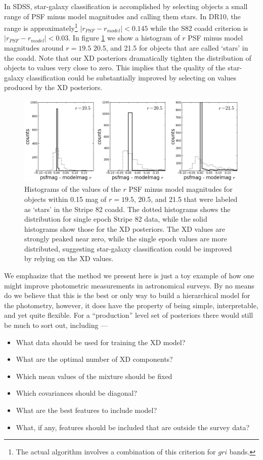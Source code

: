 \documentclass[12pt,preprint]{aastex}
\begin{document}
In SDSS, star-galaxy classification is accomplished by selecting objects a
small range of PSF minus model magnitudes and calling them stars.  In DR10,
the range is approximately\footnote{The actual algorithm involves a combination
of this criterion for $gri$ bands.} $|r_{PSF} - r_{model}| < 0.145$ while the
S82 coadd criterion is $|r_{PSF} - r_{model}| < 0.03$.  In figure \ref{fig:pmm}
we show a histogram of $r$ PSF minus model magnitudes around $r=19.5$
20.5, and 21.5 for objects that are called `stars' in the coadd.  Note that
our XD posteriors dramatically tighten the distribution of objects to values
very close to zero.  This implies that the quality of the star-galaxy
classification could be substantially improved by selecting on values produced
by the XD posteriors.

\begin{figure}
\centering
\includegraphics[width=16cm]{fig6.png}
\caption{Histograms of the values of the $r$ PSF minus model magnitudes for 
objects within 0.15 mag of $r = 19.5$, 20.5, and 21.5 that were labeled as 
`stars' in the Stripe 82 coadd.  The dotted histograms shows the distribution
for single epoch Stripe 82 data, while the solid histograms show those for the
XD posteriors.  The XD values are strongly peaked near zero, while the single
epoch values are more distributed, suggesting star-galaxy classification
could be improved by relying on the XD values.  
}
\label{fig:pmm}
\end{figure}

We emphasize that the method we present here is just a toy example of how one 
might improve photometric measurements in astronomical surveys.  By no means do
we believe that this is the best or only way to build a hierarchical model for 
the photometry, however, it does have the property of being simple,
interpretable, and yet quite flexible.  For a ``production'' level set of
posteriors there would still be much to sort out, including ---

\begin{itemize}
\item What data should be used for training the XD model?
\item What are the optimal number of XD components?
\item Which mean values of the mixture should be fixed
\item Which covariances should be diagonal?
\item What are the best features to include model?
\item What, if any, features should be included that are outside the survey
data?
\end{itemize}
\end{document}
